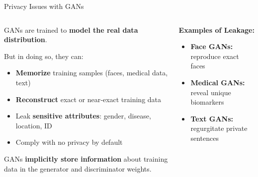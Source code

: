\documentclass[aspectratio=169,xcolor=dvipsnames,svgnames,x11names,fleqn]{beamer}
\begin{document}
\begin{frame}[fragile]{Privacy Issues with GANs}
    \begin{columns}[T]
        \begin{column}{0.5\textwidth}
            \begin{tcolorbox}[
                enhanced,
                colback=red!5,
                colframe=red!75!black,
                title=\small Modeling vs. Memorization,
                fonttitle=\bfseries,
                arc=2pt,
                boxrule=0.5pt
            ]
            \scriptsize
            GANs are trained to \textbf{model the real data distribution}. 
            \vspace{0.1cm}
            
            But in doing so, they can:
            \begin{itemize}
                \item \textbf{Memorize} training samples (faces, medical data, text)
                \item \textbf{Reconstruct} exact or near‑exact training data
                \item Leak \textbf{sensitive attributes}: gender, disease, location, ID
                \item Comply with no privacy by default
            \end{itemize}
            \end{tcolorbox}

            \begin{tcolorbox}[blanker, left=5pt, borderline west={1.5pt}{0pt}{red!75!black}]
                \tiny
                GANs \textbf{implicitly store information} about training data in the generator and discriminator weights.
            \end{tcolorbox}
        \end{column}

        \begin{column}{0.48\textwidth}
            \textbf{\footnotesize Examples of Leakage:}
            \begin{itemize}
                \footnotesize
                \item \textbf{Face GANs:} reproduce exact faces
                \item \textbf{Medical GANs:} reveal unique biomarkers
                \item \textbf{Text GANs:} regurgitate private sentences
            \end{itemize}


\end{column}
\end{columns}
\end{frame}
\end{document}
